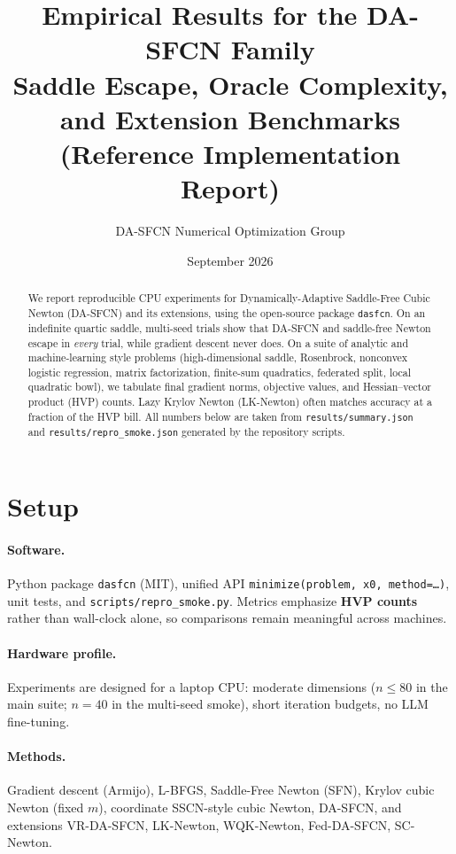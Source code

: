 \documentclass[11pt,a4paper]{article}
\title{\textbf{Empirical Results for the DA-SFCN Family}\\
\large Saddle Escape, Oracle Complexity, and Extension Benchmarks\\
\large (Reference Implementation Report)}
\author{DA-SFCN Numerical Optimization Group}
\date{September 2026}
\begin{document}
\maketitle

\begin{abstract}
We report reproducible CPU experiments for Dynamically-Adaptive
Saddle-Free Cubic Newton (DA-SFCN) and its extensions, using the
open-source package \texttt{dasfcn}. On an indefinite quartic saddle,
multi-seed trials show that DA-SFCN and saddle-free Newton escape in
\textit{every} trial, while gradient descent never does. On a suite of
analytic and machine-learning style problems (high-dimensional saddle,
Rosenbrock, nonconvex logistic regression, matrix factorization,
finite-sum quadratics, federated split, local quadratic bowl), we
tabulate final gradient norms, objective values, and Hessian--vector
product (HVP) counts. Lazy Krylov Newton (LK-Newton) often matches
accuracy at a fraction of the HVP bill. All numbers below are taken from
\texttt{results/summary.json} and \texttt{results/repro\_smoke.json}
generated by the repository scripts.
\end{abstract}

\section{Setup}
\paragraph{Software.}
Python package \texttt{dasfcn} (MIT), unified API
\texttt{minimize(problem, x0, method=\ldots)}, unit tests, and
\texttt{scripts/repro\_smoke.py}. Metrics emphasize \textbf{HVP counts}
rather than wall-clock alone, so comparisons remain meaningful across machines.

\paragraph{Hardware profile.}
Experiments are designed for a laptop CPU: moderate dimensions
($n\le 80$ in the main suite; $n=40$ in the multi-seed smoke), short
iteration budgets, no LLM fine-tuning.

\paragraph{Methods.}
Gradient descent (Armijo), L-BFGS, Saddle-Free Newton (SFN), Krylov cubic
Newton (fixed $m$), coordinate SSCN-style cubic Newton, DA-SFCN, and
extensions VR-DA-SFCN, LK-Newton, WQK-Newton, Fed-DA-SFCN, SC-Newton.
\end{document}
